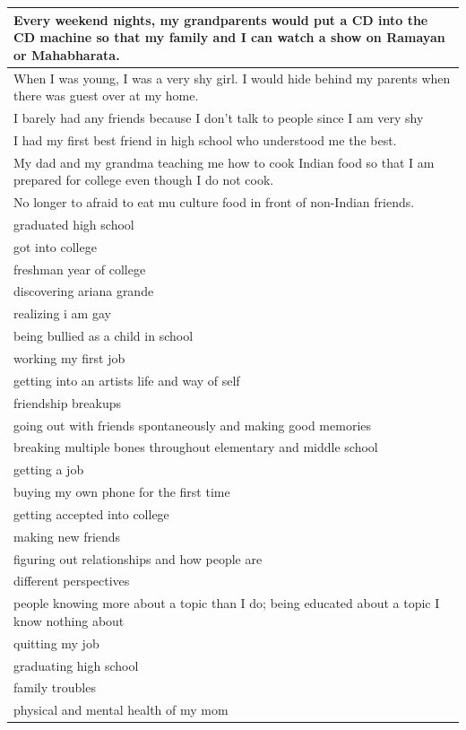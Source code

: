 \documentclass[
  .7em,
  letterpaper,
  DIV=11,
  numbers=noendperiod]{scrartcl}
\begin{document}
\begin{table}
\begin{tabular}{l}
\hline
Every weekend nights, my grandparents would put a CD into the CD machine so that my family and I can watch a show on Ramayan or Mahabharata.\\
\hline
When I was young, I was a very shy girl. I would hide behind my parents when there was guest over at my home.\\
\hline
I barely had any friends because I don't talk to people since I am very shy\\
\hline
I had my first best friend in high school who understood me the best.\\
\hline
My dad and my grandma teaching me how to cook Indian food so that I am prepared for college even though I do not cook.\\
\hline
No longer to afraid to eat mu culture food in front of non-Indian friends.\\
\hline
graduated high school\\
\hline
got into college\\
\hline
freshman year of college\\
\hline
discovering ariana grande\\
\hline
realizing i am gay\\
\hline
being bullied as a child in school\\
\hline
working my first job\\
\hline
getting into an artists life and way of self\\
\hline
friendship breakups\\
\hline
going out with friends spontaneously and making good memories\\
\hline
breaking multiple bones throughout elementary and middle school\\
\hline
getting a job\\
\hline
buying my own phone for the first time\\
\hline
getting accepted into college\\
\hline
making new friends\\
\hline
figuring out relationships and how people are\\
\hline
different perspectives\\
\hline
people knowing more about a topic than I do; being educated about a topic I know nothing about\\
\hline
quitting my job\\
\hline
graduating high school\\
\hline
family troubles\\
\hline
physical and mental health of my mom\\

\end{tabular}
\end{table}
\end{document}
